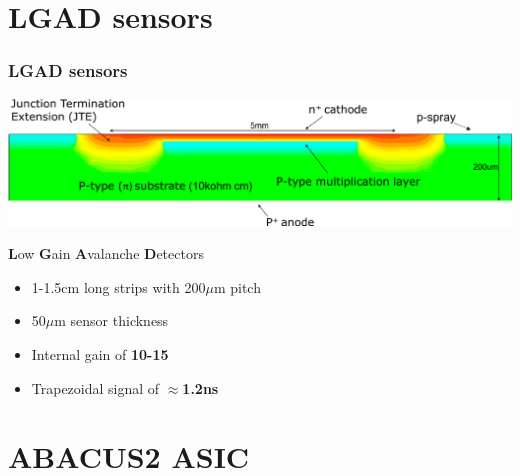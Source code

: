 \documentclass[aspectratio=169]{beamer}
\begin{document}
	\section{LGAD sensors}
	
	\begin{frame}
	\frametitle{LGAD sensors}
		\begin{center}
			\includegraphics[width=0.9 \textwidth]{IMG/LGAD_image.PNG}
		\end{center}
	\textbf{L}ow \textbf{G}ain \textbf{A}valanche \textbf{D}etectors
		\begin{itemize}
			\item 1-1.5cm long strips with 200$\mu$m pitch
			\item 50$\mu$m sensor thickness
			\item Internal gain of \textbf{10-15} 
			\item Trapezoidal signal of $\approx$\textbf{1.2ns}
		\end{itemize}
	\end{frame}

	\section{ABACUS2 ASIC}
	
\end{document}
